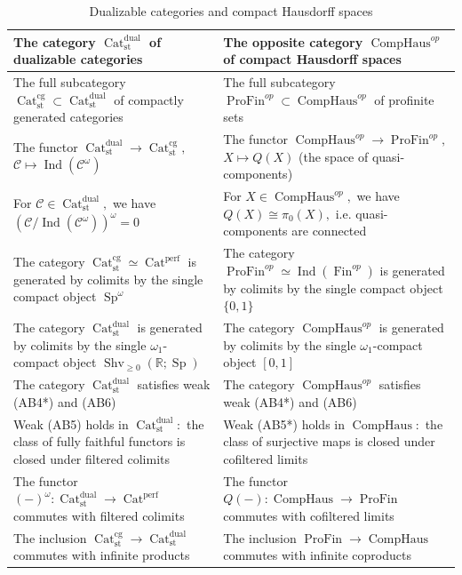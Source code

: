 \documentclass[11pt,leqno]{amsart}
\numberwithin{equation}{section}
\def\R{\mathbb{R}}
\newcommand{\Fin}{\operatorname{Fin}}
\newcommand{\profin}{\operatorname{ProFin}}
\newcommand{\comphaus}{\operatorname{CompHaus}}
\newcommand{\Cat}{\operatorname{Cat}}
\newcommand{\st}{\operatorname{st}}
\newcommand{\cg}{\operatorname{cg}}
\newcommand{\dual}{\operatorname{dual}}
\newcommand{\cC}{{\mathcal C}}
\newcommand{\perf}{\operatorname{perf}}
\newcommand{\Sh}{\operatorname{Shv}}
\newcommand{\Sp}{\operatorname{Sp}}
\newcommand{\Ind}{\operatorname{Ind}}
\begin{document}
\begin{longtable}{ | m{20em} | m{20em} | }
\caption{Dualizable categories and compact Hausdorff spaces}
\label{tab:analogy}\\
\hline
The category $\Cat_{\st}^{\dual}$ of dualizable categories & The opposite category $\comphaus^{op}$ of compact Hausdorff spaces\\
\hline
The full subcategory $\Cat_{\st}^{\cg}\subset\Cat_{\st}^{\dual}$ of compactly generated categories & The full subcategory $\profin^{op}\subset\comphaus^{op}$ of profinite sets\\
\hline
The functor $\Cat_{\st}^{\dual}\to\Cat_{\st}^{\cg},$ $\cC\mapsto \Ind(\cC^{\omega})$ & The functor $\comphaus^{op}\to\profin^{op},$ $X\mapsto Q(X)$ (the space of quasi-components)\\
\hline
For $\cC\in\Cat_{\st}^{\dual},$ we have $(\cC/\Ind(\cC^{\omega}))^{\omega}=0$ & For $X\in\comphaus^{op},$ we have $Q(X)\cong \pi_0(X),$ i.e. quasi-components are connected\\
\hline
The category $\Cat_{\st}^{\cg}\simeq\Cat^{\perf}$ is generated by colimits by the single compact object $\Sp^{\omega}$ & The category $\profin^{op}\simeq\Ind(\Fin^{op})$ is generated by colimits by the single compact object $\{0,1\}$ \\
\hline
The category $\Cat_{\st}^{\dual}$ is generated by colimits by the single $\omega_1$-compact object $\Sh_{\geq 0}(\R;\Sp)$ & The category $\comphaus^{op}$ is generated by colimits by the single $\omega_1$-compact object $[0,1]$\\
\hline
The category $\Cat_{\st}^{\dual}$ satisfies weak (AB4*) and (AB6) & The category $\comphaus^{op}$ satisfies weak (AB4*) and (AB6)\\
\hline
Weak (AB5) holds in $\Cat_{\st}^{\dual}:$ the class of fully faithful functors   is closed under filtered colimits & Weak (AB5*) holds in $\comphaus:$ the class of surjective maps is closed under cofiltered limits\\
\hline
The functor $(-)^{\omega}:\Cat_{\st}^{\dual}\to\Cat^{\perf}$ commutes with filtered colimits & The functor $Q(-):\comphaus\to\profin$ commutes with cofiltered limits\\
\hline
The inclusion $\Cat_{\st}^{\cg}\to\Cat_{\st}^{\dual}$ commutes with infinite products & The inclusion $\profin\to\comphaus$ commutes with infinite coproducts\\

\end{longtable}
\end{document}

